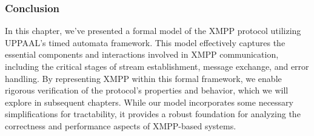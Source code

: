 \subsubsection{Conclusion}
In this chapter, we've presented a formal model of the XMPP protocol utilizing UPPAAL's timed automata framework. This model effectively captures the essential components and interactions involved in XMPP communication, including the critical stages of stream establishment, message exchange, and error handling. By representing XMPP within this formal framework, we enable rigorous verification of the protocol's properties and behavior, which we will explore in subsequent chapters. While our model incorporates some necessary simplifications for tractability, it provides a robust foundation for analyzing the correctness and performance aspects of XMPP-based systems.